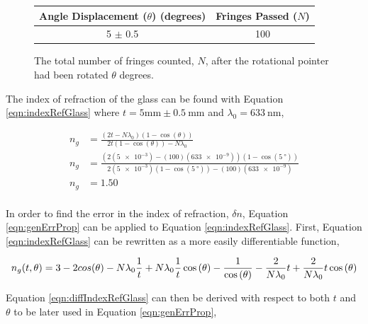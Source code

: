 \documentclass[12pt]{article}
\begin{document}
\begin{figure}[H]
  \label{tab:exp3Data}
  \caption{The total number of fringes counted, \(N\), after the rotational
    pointer had been rotated \(\theta\) degrees.}
  \begin{center}
    \begin{tabular}{|c|c|}
      \hline
      Angle Displacement (\(\theta\)) (degrees) & Fringes Passed (\(N\)) \\
      \hline
      5 \(\pm\) 0.5 & 100 \\
      \hline
    \end{tabular}
  \end{center}
\end{figure}

\qq The index of refraction of the glass can be found with Equation
\ref{eqn:indexRefGlass} where
\(t = 5 \si{\milli\meter} \pm \SI{0.5}{\milli\meter}\) and
\(\lambda_0 = \SI{633}{\nano\meter}\),

\begin{align*}
  n_g &= \frac{(2 t - N \lambda_0) (1 - \cos{(\theta)})}{2 t (1 - \cos{(\theta)})
  - N \lambda_0} \\
  n_g &= \frac{\left( 2 (\num{5e-3}) - (100) (\num{633e-9}) \right) \left( 1 -
        \cos{(\SI{5}{\degree})} \right)}{ 2 (\num{5e-3}) \left( 1 -
        \cos{(\SI{5}{\degree})} \right) - (100) (\num{633e-9}) } \\
  n_g &= \num{1.50} \\
\end{align*}

\qq In order to find the error in the index of refraction, \(\delta n\),
Equation \ref{eqn:genErrProp} can be applied to Equation
\ref{eqn:indexRefGlass}. First, Equation \ref{eqn:indexRefGlass} can be
rewritten as a more easily differentiable function,

\begin{equation}
  \label{eqn:diffIndexRefGlass}
  n_g(t,\theta) = 3 - 2 cos{(\theta)} - N \lambda_0 \frac{1}{t} + N
    \lambda_0 \frac{1}{t} \cos{(\theta)} - \frac{1}{\cos{(\theta)}} - \frac{2}{N
    \lambda_0} t + \frac{2}{N \lambda_0} t \cos{(\theta)} \\
\end{equation}

Equation \ref{eqn:diffIndexRefGlass} can then be derived with respect to both
\(t\) and \(\theta\) to be later used in Equation \ref{eqn:genErrProp},
\end{document}
